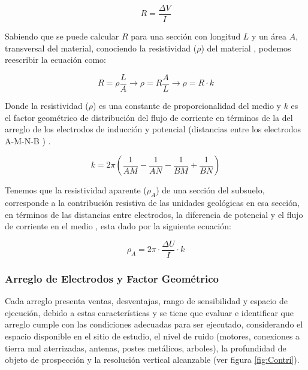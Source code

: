 			\begin{equation}
				R = \frac{\Delta V}{I}
			\end{equation}
			   
			Sabiendo que se puede calcular $R$ para una sección con longitud $L$ y un área $A$, transversal del material, conociendo la resistividad ($\rho$) del material \citep{igboama2023, lowrie2020}, podemos reescribir la ecuación como: 
			
			\begin{equation}
				R = \rho \frac{L}{A}  \rightarrow  	\rho  = R \frac{A}{L} \rightarrow \rho  = R \cdot k
			\end{equation}
			
			Donde la resistividad ($\rho$) es una constante de proporcionalidad del medio y $k$ es el factor geométrico de distribución del flujo de corriente en términos de la del arreglo  de los electrodos de inducción y potencial (distancias entre los electrodos A-M-N-B ) \citep{igboama2023, lowrie2020}.
			
			\begin{equation}
				k = 2\pi \left(  \dfrac{1}{AM} - \dfrac{1}{AN} - \dfrac{1}{BM} + \dfrac{1}{BN} \right) 
			\end{equation}
			
			Tenemos que la resistividad aparente ($\rho _{A}$) de una sección del subsuelo, corresponde a la contribución resistiva de las unidades geológicas en esa sección, en términos de las distancias entre electrodos, la diferencia de potencial y el flujo de corriente en el medio \citep{igboama2023, lowrie2020}, esta dado por la siguiente ecuación:
			
			\begin{equation}
				\rho_{A} = 2\pi \cdot \frac{\Delta U}{I} \cdot k
			\end{equation}
			
			\subsubsection{Arreglo de Electrodos y Factor Geométrico}
			
				Cada arreglo presenta ventas, desventajas, rango de sensibilidad y espacio de ejecución, debido a estas características y se tiene que evaluar e identificar que arreglo cumple con las condiciones adecuadas para ser ejecutado, considerando el espacio disponible en el sitio de estudio, el nivel de ruido (motores, conexiones a tierra mal aterrizadas, antenas, postes metálicos, arboles), la profundidad de objeto de prospección y la resolución vertical alcanzable (ver figura \ref{fig:Contri}).
				
